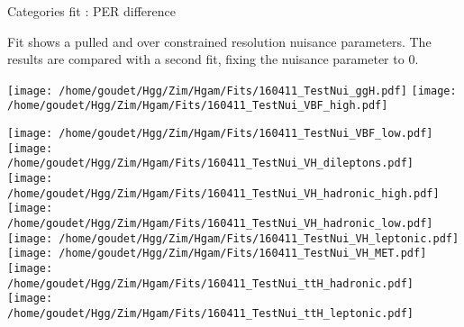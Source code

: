 \documentclass[a4paper]{beamer}
\begin{document}
\begin{frame}{Categories fit : PER difference}

  \begin{minipage}{0.49\linewidth}
    Fit shows a pulled and over constrained resolution nuisance parameters.
    The results are compared with a second fit, fixing the nuisance parameter to $0$.
  \end{minipage}
  \hfill
  \begin{minipage}{0.49\linewidth}
    \texttt{[image: /home/goudet/Hgg/Zim/Hgam/Fits/160411\_TestNui\_ggH.pdf]}
    \texttt{[image: /home/goudet/Hgg/Zim/Hgam/Fits/160411\_TestNui\_VBF\_high.pdf]}
  \end{minipage}

  \texttt{[image: /home/goudet/Hgg/Zim/Hgam/Fits/160411\_TestNui\_VBF\_low.pdf]}
  \texttt{[image: /home/goudet/Hgg/Zim/Hgam/Fits/160411\_TestNui\_VH\_dileptons.pdf]}
  \texttt{[image: /home/goudet/Hgg/Zim/Hgam/Fits/160411\_TestNui\_VH\_hadronic\_high.pdf]}
  \texttt{[image: /home/goudet/Hgg/Zim/Hgam/Fits/160411\_TestNui\_VH\_hadronic\_low.pdf]}
  \newline
  \texttt{[image: /home/goudet/Hgg/Zim/Hgam/Fits/160411\_TestNui\_VH\_leptonic.pdf]}
  \texttt{[image: /home/goudet/Hgg/Zim/Hgam/Fits/160411\_TestNui\_VH\_MET.pdf]}
  \texttt{[image: /home/goudet/Hgg/Zim/Hgam/Fits/160411\_TestNui\_ttH\_hadronic.pdf]}
  \texttt{[image: /home/goudet/Hgg/Zim/Hgam/Fits/160411\_TestNui\_ttH\_leptonic.pdf]}
\end{frame}

\appendix
\end{document}
